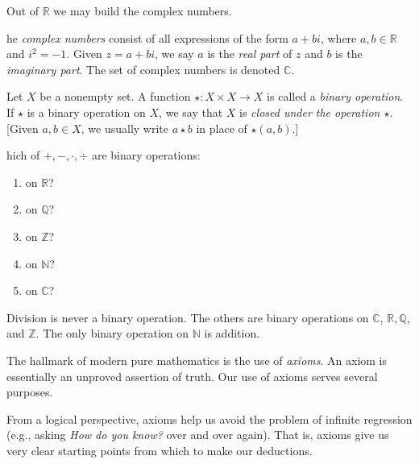 \documentclass[english,course]{lecture}
\theoremstyle{plain}
\newenvironment{question}[1]
  {\renewcommand\theinnerquestion{#1}\innerquestion}
  {\endinnerquestion}
\newenvironment{definition}[1]
  {\renewcommand\theinnerdefinition{#1}\innerdefinition}
  {\endinnerdefinition}
\def\C{{\mathbb C}}
\def\Z{{\mathbb Z}}
\def\Q{{\mathbb Q}}
\def\N{{\mathbb N}}
\def\R{{\mathbb R}}
\def\presnotes{}
\begin{document}
Out of $\R$ we may build the complex numbers.

\begin{definition}
	The \emph{complex numbers} consist of all expressions of the form $a+bi$, where $a,b\in \R$ and $i^2 = -1$.
	Given $z = a+bi$, we say $a$ is the \emph{real part} of $z$ and $b$ is the \emph{imaginary part}.
	The set of complex numbers is denoted $\C$.
\end{definition}






\begin{definition}\label{def:binaryoperation}
	Let $X$ be a nonempty set.
	A function $\star : X \times X \to X$ is called a \emph{binary operation}.
	If $\star$ is a binary operation on $X$, we say that $X$ is \emph{closed under the operation $\star$}.
	[Given $a,b\in X$, we usually write $a\star b$ in place of $\star(a,b)$.]
\end{definition}


\begin{question}
	Which of $+, -, \cdot, \div$ are binary operations:
	\begin{enumerate}
		\item on $\R$? 
		\item on $\Q$? 
		\item on $\Z$? 
		\item on $\N$?
        \item on $\C$?
	\end{enumerate}
\end{question}

\begin{answer}
	Division is never a binary operation.
	The others are binary operations on $\C$, $\R, \Q$, and $\Z$.
	The only binary operation on $\N$ is addition.
\end{answer}

\presnotes


The hallmark of modern pure mathematics is the use of \emph{axioms}.
An axiom is essentially an unproved assertion of truth.
Our use of axioms serves several purposes.

From a logical perspective, axioms help us avoid the problem of infinite regression (e.g., asking \emph{How do you know?} over and over again). That is, axioms give us very clear starting points from which to make our deductions.
\end{document}
